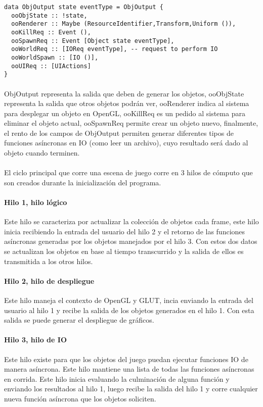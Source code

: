 \documentclass{standalone}
\begin{document}
\begin{lstlisting}
data ObjOutput state eventType = ObjOutput {
  ooObjState :: !state,
  ooRenderer :: Maybe (ResourceIdentifier,Transform,Uniform ()),
  ooKillReq :: Event (),
  ooSpawnReq :: Event [Object state eventType],
  ooWorldReq :: [IOReq eventType], -- request to perform IO
  ooWorldSpawn :: [IO ()],
  ooUIReq :: [UIActions]
}
\end{lstlisting}

\paragraph{}
ObjOutput representa la salida que deben de generar los objetos, ooObjState representa la salida que otros objetos podrán ver, ooRenderer indica al sistema para desplegar un objeto en OpenGL, ooKillReq es un pedido al sistema para eliminar el objeto actual, ooSpawnReq permite crear un objeto nuevo, finalmente, el rento de los campos de ObjOutput permiten generar diferentes tipos de funciones asíncronas en IO (como leer un archivo), cuyo resultado será dado al objeto cuando terminen.

\paragraph{}
El ciclo principal que corre una escena de juego corre en 3 hilos de cómputo que son creados durante la inicialización del programa.

\paragraph{Hilo 1, hilo lógico}
Este hilo se caracteriza por actualizar la colección de objetos cada frame, este hilo inicia recibiendo la entrada del usuario del hilo 2 y el retorno de las funciones asíncronas generadas por los objetos manejados por el hilo 3. Con estos dos datos se actualizan los objetos en base al tiempo transcurrido y la salida de ellos es transmitida a los otros hilos.

\paragraph{Hilo 2, hilo de despliegue}
Este hilo maneja el contexto de OpenGL y GLUT, incia enviando la entrada del usuario al hilo 1 y recibe la salida de los objetos generados en el hilo 1. Con esta salida se puede generar el despliegue de gráficos.

\paragraph{Hilo 3, hilo de IO}
Este hilo existe para que los objetos del juego puedan ejecutar funciones IO de manera asíncrona. Este hilo mantiene una lista de todas las funciones asíncronas en corrida. Este hilo inicia evaluando la culminación de alguna función y enviando los resultados al hilo 1, luego recibe la salida del hilo 1 y corre cualquier nueva función asíncrona que los objetos soliciten.
\end{document}
